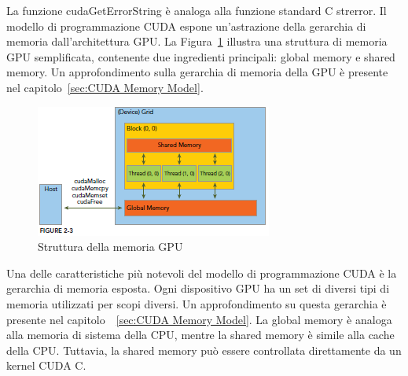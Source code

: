 La funzione cudaGetErrorString è analoga alla funzione standard C strerror.
Il modello di programmazione CUDA espone un'astrazione della gerarchia di memoria dall'architettura GPU. La Figura~\ref{fig:GPU_Memory_Structure} illustra una struttura di memoria GPU semplificata, contenente due ingredienti principali: global memory e shared memory. Un approfondimento sulla gerarchia di memoria della GPU è presente nel capitolo~\ref{sec:CUDA Memory Model}.
\begin{figure}[h!]
	\centering
	\includegraphics[width=.75\textwidth]{Immagini/CUDA/GPU_Memory_Structure}
	\caption{Struttura della memoria GPU \cite{Cheng:ProfessionalCudaProgramming}}
	\label{fig:GPU_Memory_Structure}
\end{figure}
Una delle caratteristiche più notevoli del modello di programmazione CUDA è la gerarchia di memoria esposta. Ogni dispositivo GPU ha un set di diversi tipi di memoria utilizzati per scopi diversi. Un approfondimento su questa gerarchia è presente nel capitolo~~\ref{sec:CUDA Memory Model}. La global memory è analoga alla memoria di sistema della CPU, mentre la shared memory è simile alla cache della CPU. Tuttavia, la shared memory può essere controllata direttamente da un kernel CUDA C.

